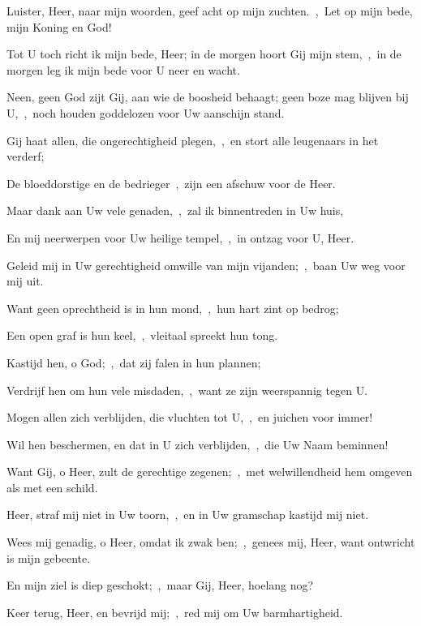 \documentclass[12pt,twoside,a5paper]{article}
\begin{document}
\begin{halfparskip}
   Luister, Heer, naar mijn woorden, geef acht op mijn zuchten.~\sep\ Let op mijn bede, mijn Koning en God!


  Tot U toch richt ik mijn bede, Heer; in de morgen hoort Gij mijn stem,~\sep\ in de morgen leg ik mijn bede voor U neer en wacht.

  Neen, geen God zijt Gij, aan wie de boosheid behaagt; geen boze mag blijven bij U,~\sep\ noch houden goddelozen voor Uw aanschijn stand.

  Gij haat allen, die ongerechtigheid plegen,~\sep\ en stort alle leugenaars in het verderf;

  De bloeddorstige en de bedrieger~\sep\ zijn een afschuw voor de Heer.

  Maar dank aan Uw vele genaden,~\sep\ zal ik binnentreden in Uw huis,

  En mij neerwerpen voor Uw heilige tempel,~\sep\ in ontzag voor U, Heer.

  Geleid mij in Uw gerechtigheid omwille van mijn vijanden;~\sep\ baan Uw weg voor mij uit.

  Want geen oprechtheid is in hun mond,~\sep\ hun hart zint op bedrog;

  Een open graf is hun keel,~\sep\ vleitaal spreekt hun tong.

  Kastijd hen, o God;~\sep\ dat zij falen in hun plannen;

  Verdrijf hen om hun vele misdaden,~\sep\ want ze zijn weerspannig tegen U.

  Mogen allen zich verblijden, die vluchten tot U,~\sep\ en juichen voor immer!

  Wil hen beschermen, en dat in U zich verblijden,~\sep\ die Uw Naam beminnen!

  Want Gij, o Heer, zult de gerechtige zegenen;~\sep\ met welwillendheid hem omgeven als met een schild.

   Heer, straf mij niet in Uw toorn,~\sep\ en in Uw gramschap kastijd mij niet.

  Wees mij genadig, o Heer, omdat ik zwak ben;~\sep\ genees mij, Heer, want ontwricht is mijn gebeente.

  En mijn ziel is diep geschokt;~\sep\ maar Gij, Heer, hoelang nog?

  Keer terug, Heer, en bevrijd mij;~\sep\ red mij om Uw barmhartigheid.


\end{halfparskip}
\end{document}
